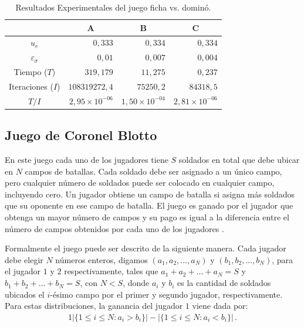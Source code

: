 \begin{table}[h]
\caption{Resultados Experimentales del juego ficha vs. dominó.}
\label{table:resultados-rm-domino}
\centering
\begin{tabular}{c r r r}
    \toprule
    & \multicolumn{1}{c}{A} & \multicolumn{1}{c}{B} & \multicolumn{1}{c}{C} \\ \midrule
    $u_e$ & $0,333$ & $0,334$ & $0,334$  \\
    $\varepsilon_{\sigma}$ & $0,01$ & $0,007$ & $0,004$ \\
    Tiempo ($T$) & $319,179$ & $11,275$ & $0,237$  \\
    Iteraciones ($I$) & $108319272,4$ & $75250,2$ & $84318,5$ \\
    $T/I$ & $2,95 {\times} 10^{-06}$ & $1,50 {\times} 10^{-04}$ & $2,81 {\times} 10^{-06}$ \\
    \bottomrule
\end{tabular}
\end{table}

 
\subsection*{Juego de Coronel Blotto}

En este juego cada uno de los jugadores tiene $S$ soldados en total que debe ubicar en $N$ campos de batallas. Cada soldado debe ser asignado a un único campo, pero cualquier número de soldados puede ser colocado en cualquier campo, incluyendo cero. Un jugador obtiene un campo de batalla si asigna más soldados que su oponente en ese campo de batalla. El juego es ganado por el jugador que obtenga un mayor número de campos y su pago es igual a la diferencia entre el número de campos obtenidos por cada uno de los jugadores \cite{bib:blotto-game}.

Formalmente el juego puede ser descrito de la siguiente manera. Cada jugador debe elegir $N$ números enteros, digamos $(a_1, a_2, ..., a_N)$ y $(b_1, b_2, ..., b_N)$, para el jugador $1$ y $2$ respectivamente, tales que $a_1 + a_2 + ... + a_N = S$ y $b_1 + b_2 + ... + b_N = S$, con $N < S$, donde $a_i$ y $b_i$ es la cantidad de soldados ubicados el $i$-ésimo campo por el primer y segundo jugador, respectivamente. Para estas distribuciones, la ganancia del jugador $1$ viene dada por:
\begin{alignat}{1}
|\{ 1 \leq i \leq N : a_i > b_i\}| - |\{ 1 \leq i \leq N : a_i < b_i\}| \,.
\end{alignat}

